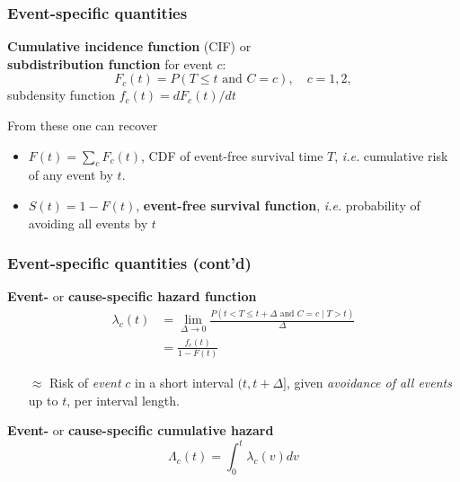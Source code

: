 \documentclass[handout,12pt]{beamer}
\begin{document}
\begin{frame}
\frametitle{Event-specific quantities}

\textbf{Cumulative incidence function} (CIF) or \\
 \textbf{subdistribution function} for event $c$:
\[  F_c(t) = P(T \leq t \text{ and } C = c ), \quad c = 1,2,  \]
{subdensity function} $f_c(t) = dF_c(t)/dt$ 

\medskip
From these one can recover
\begin{itemize}
\item
$F(t) = \sum_{c} F_c(t)$, CDF of event-free survival time $T$, \textit{i.e.} 
cumulative risk of any event by $t$.
\medskip
\item
$S(t) = 1 - F(t)$, \textbf{event-free survival function}, \textit{i.e.} probability of avoiding all events by $t$
\end{itemize}
\end{frame}

\begin{frame}
\frametitle{Event-specific quantities (cont'd)}

\textbf{Event-} or \textbf{cause-specific hazard function}
\begin{align*}
 \lambda_c(t) & =  \underset{\Delta\to 0}{\lim} 
    \frac{P(t < T \le t+\Delta \text{ and } C = c \mid T > t)}{\Delta}  \\
        & =  \frac{f_c(t)}{1-F(t)}
\end{align*}
\begin{itemize}
\item[$\approx$] Risk of \textit{event} $c$ 
in a short interval $(t, t+ \Delta]$,  given 
\textit{avoidance of all events} up to $t$, 
per interval length.
\end{itemize}

\textbf{Event-} or \textbf{cause-specific cumulative hazard} 
 $$ \Lambda_c(t) = \int_0^t \lambda_c(v)dv $$ 

\end{frame}
\end{document}
